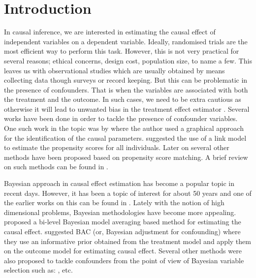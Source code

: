 \documentclass{amsart}
\begin{document}
\section{Introduction}\label{sec:intro}

In causal inference, we are interested in estimating the causal
effect of independent variables on a dependent variable. Ideally,
randomised trials are the most efficient way to perform this task.
However, this is not very practical for several reasons; ethical 
concerns, design cost, population size, to name a few. This
leaves us with observational studies which are usually obtained
by means collecting data though surveys or record keeping. But this
can be problematic in the presence of confounders. That is when
the variables are associated with both the treatment and the outcome.
In such cases, we need to be extra cautious as otherwise it will
lead to unwanted bias in the treatment effect estimator \cite{rosenbaum83}.
Several works have been done in order to tackle the presence of
confounder variables. One such work in the topic was 
by \citet{Robins1986ANA} where the author used  a graphical
approach for the identification of the causal parameters.
\citet{rosenbaum1985} suggested the use of a link model to estimate
the propensity scores for all individuals. Later on several other
methods have been proposed based on propensity score matching.
A brief review on such methods can be found in \cite{winship99, stuart10}.

Bayesian approach in causal effect estimation has become a popular
topic in recent days. However, it has been a topic of interest for about 50 
years and one of the earlier works on this can be
found in \cite{rubin1978}. Lately with the notion of high dimensional problems, Bayesian methodologies have become
more appealing. \citet{Crainiceanu2008} proposed a bi-level 
Bayesian model averaging based method for estimating the causal 
effect. \citet{wang2015} suggested BAC (or, Bayesian adjustment for
confounding) where they use an informative prior obtained from
the treatment model and apply them on the outcome model for
estimating causal effect. Several other methods were also
proposed to tackle confounders from the point of view of Bayesian
variable selection such as: \citet{Zigler2014}, \citet{Hahn2018} etc.
\end{document}
